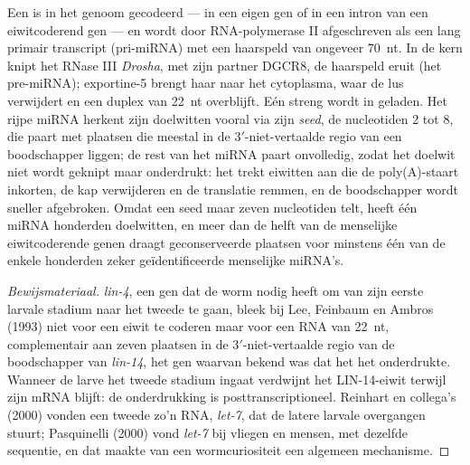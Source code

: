 \begin{definition}[MicroRNA's]\label{def:b3:rna-regulation:mirna}
Een \emph{} is in het genoom gecodeerd --- in een eigen gen of
in een intron van een eiwitcoderend gen --- en wordt door
RNA-polymerase II afgeschreven als een lang primair transcript
(pri-miRNA) met een haarspeld van ongeveer \qty{70}{nt}. In de kern
knipt het RNase III \emph{Drosha}, met zijn partner DGCR8, de
haarspeld eruit (het pre-miRNA); exportine-5 brengt haar naar het
cytoplasma, waar  de lus verwijdert en een duplex van
\qty{22}{nt} overblijft. Eén streng wordt in  geladen. Het
rijpe miRNA herkent zijn doelwitten vooral via zijn \emph{seed}, de
nucleotiden 2 tot 8, die paart met plaatsen die meestal in de
3$'$-niet-vertaalde regio van een boodschapper liggen; de rest van het
miRNA paart onvolledig, zodat het doelwit niet wordt geknipt maar
onderdrukt: het  trekt eiwitten aan die de poly(A)-staart
inkorten, de kap verwijderen en de translatie remmen, en de
boodschapper wordt sneller afgebroken. Omdat een seed maar zeven
nucleotiden telt, heeft één miRNA honderden doelwitten, en meer dan de
helft van de menselijke eiwitcoderende genen draagt geconserveerde
plaatsen voor minstens één van de enkele honderden zeker
geïdentificeerde menselijke miRNA's.
\end{definition}

\begin{proof}[Bewijsmateriaal]
\emph{lin-4}, een gen dat de worm nodig heeft om van zijn eerste
larvale stadium naar het tweede te gaan, bleek bij Lee, Feinbaum en
Ambros (1993) niet voor een eiwit te coderen maar voor een RNA van
\qty{22}{nt}, complementair aan zeven plaatsen in de
3$'$-niet-vertaalde regio van de boodschapper van \emph{lin-14}, het
gen waarvan bekend was dat het het onderdrukte. Wanneer de larve het
tweede stadium ingaat verdwijnt het LIN-14-eiwit terwijl zijn mRNA
blijft: de onderdrukking is posttranscriptioneel. Reinhart en
collega's (2000) vonden een tweede zo'n RNA, \emph{let-7}, dat de
latere larvale overgangen stuurt; Pasquinelli (2000) vond
\emph{let-7} bij vliegen en mensen, met dezelfde sequentie, en dat
maakte van een wormcuriositeit een algemeen mechanisme.
\end{proof}

